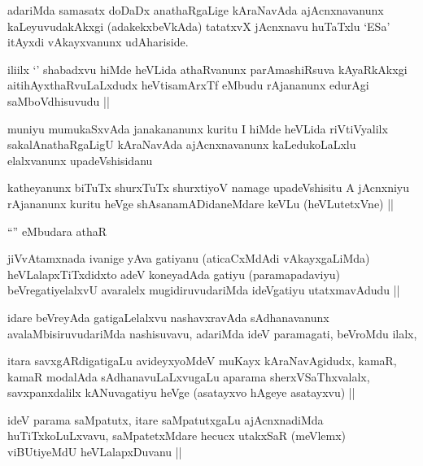\begin{artha}
adariMda samasatx doDaDx anathaRgaLige kAraNavAda ajAcnxnavanunx
kaLeyuvudakAkxgi (adakekxbeVkAda) tatatxvX jAcnxnavu huTaTxlu `ESa'
itAyxdi vAkayxvanunx udAhariside.
\end{artha}


\begin{artha}
iliilx `\stext' shabadxvu hiMde heVLida athaRvanunx parAmashiRsuva
kAyaRkAkxgi aitihAyxthaRvuLaLxdudx heVtisamArxTf eMbudu rAjananunx
edurAgi saMboVdhisuvudu ||
\end{artha}


\begin{artha}
muniyu mumukaSxvAda janakananunx kuritu I hiMde heVLida riVtiVyalilx
sakalAnathaRgaLigU kAraNavAda ajAcnxnavanunx kaLedukoLaLxlu
elalxvanunx upadeVshisidanu
\end{artha}

\begin{artha}
katheyanunx biTuTx shurxTuTx shurxtiyoV namage upadeVshisitu A
jAcnxniyu rAjananunx kuritu heVge shAsanamADidaneMdare keVLu
(heVLutetxVne) ||
\end{artha}

``\stext'' eMbudara athaR

\begin{artha}
jiVvAtamxnada ivanige yAva gatiyanu (aticaCxMdAdi vAkayxgaLiMda)
heVLalapxTiTxdidxto adeV koneyadAda gatiyu (paramapadaviyu)
beVregatiyelalxvU avaralelx mugidiruvudariMda ideVgatiyu utatxmavAdudu ||
\end{artha}


\begin{artha}
idare beVreyAda gatigaLelalxvu nashavxravAda sAdhanavanunx
avalaMbisiruvudariMda nashisuvavu, adariMda ideV paramagati, beVroMdu
ilalx,
\end{artha}

\begin{artha}
itara savxgARdigatigaLu avideyxyoMdeV muKayx kAraNavAgidudx, kamaR,
kamaR modalAda sAdhanavuLaLxvugaLu aparama sherxVSaThxvalalx,
savxpanxdalilx kANuvagatiyu heVge (asatayxvo hAgeye asatayxvu) ||
\end{artha}

\begin{artha}
ideV parama saMpatutx, itare saMpatutxgaLu ajAcnxnadiMda
huTiTxkoLuLxvavu, saMpatetxMdare hecucx utakxSaR (meVlemx) viBUtiyeMdU
heVLalapxDuvanu ||
\end{artha}


